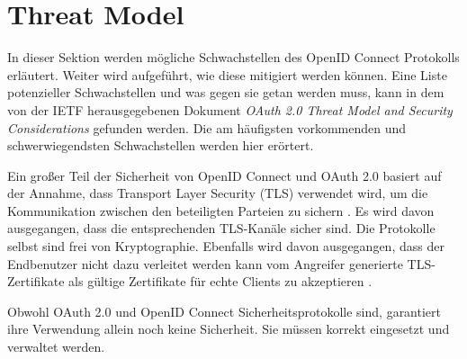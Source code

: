 \section{Threat Model} \label{SSEB_Threat Model}

In dieser Sektion werden mögliche Schwachstellen des OpenID Connect Protokolls erläutert. Weiter wird aufgeführt, wie diese mitigiert werden können. Eine Liste potenzieller Schwachstellen und was gegen sie getan werden muss, kann in dem von der IETF herausgegebenen Dokument \textit{OAuth 2.0 Threat Model and Security Considerations} \cite{SSEB_RFC6819} gefunden werden. Die am häufigsten vorkommenden und schwerwiegendsten Schwachstellen werden hier erörtert. \cite{SSEB_ssoProtocols}

Ein großer Teil der Sicherheit von OpenID Connect und OAuth 2.0 basiert auf der Annahme, dass Transport Layer Security (TLS) verwendet wird, um die Kommunikation zwischen den beteiligten Parteien zu sichern \cite{SSEB_mladenov2016security}. Es wird davon ausgegangen, dass die entsprechenden TLS-Kanäle sicher sind. Die Protokolle selbst sind frei von Kryptographie. Ebenfalls wird davon ausgegangen, dass der Endbenutzer nicht dazu verleitet werden kann vom Angreifer generierte TLS-Zertifikate als gültige Zertifikate für echte Clients zu akzeptieren \cite{SSEB_mladenov2016security}.

Obwohl OAuth 2.0 und OpenID Connect Sicherheitsprotokolle sind, garantiert ihre Verwendung allein noch keine Sicherheit. Sie müssen korrekt eingesetzt und verwaltet werden.

